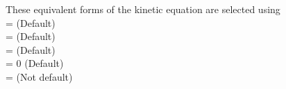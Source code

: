 These equivalent forms of the kinetic equation are selected using \\
 = \true  \;\;\; (Default) \\
 = \true \;\;\; (Default) \\
 = \false \;\;\; (Default) \\
 = 0 \;\;\; (Default) \\
 = \true \;\;\; (Not default) %



